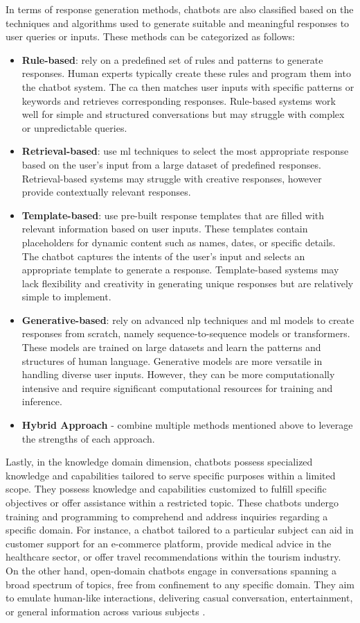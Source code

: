 \documentclass[a4paper,fleqn]{cas-dc}
\begin{document}
In terms of response generation methods, chatbots are also classified based on the techniques and algorithms used to generate suitable and meaningful responses to user queries or inputs. These methods can be categorized as follows:

\begin{itemize}
	\item \textbf{Rule-based}: rely on a predefined set of rules and patterns to generate responses. Human experts typically create these rules and program them into the chatbot system. The \gls{ca} then matches user inputs with specific patterns or keywords and retrieves corresponding responses. Rule-based systems work well for simple and structured conversations but may struggle with complex or unpredictable queries.
	\item \textbf{Retrieval-based}: use \gls{ml} techniques to select the most appropriate response based on the user's input from a large dataset of predefined responses. Retrieval-based systems may struggle with creative responses, however provide contextually relevant responses.
	\item \textbf{Template-based}:  use pre-built response templates that are filled with relevant information based on user inputs. These templates contain placeholders for dynamic content such as names, dates, or specific details. The chatbot captures the intents of the user's input and selects an appropriate template to generate a response. Template-based systems may lack flexibility and creativity in generating unique responses but are relatively simple to implement.
	\item \textbf{Generative-based}: rely on advanced \gls{nlp} techniques and \gls{ml} models to create responses from scratch, namely sequence-to-sequence models or transformers. These models are trained on large datasets and learn the patterns and structures of human language. Generative models are more versatile in handling diverse user inputs. However, they can be more computationally intensive and require significant computational resources for training and inference.
	\item \textbf{Hybrid Approach} - combine multiple methods mentioned above to leverage the strengths of each approach.
\end{itemize}

Lastly, in the knowledge domain dimension, chatbots possess specialized knowledge and capabilities tailored to serve specific purposes within a limited scope. They possess knowledge and capabilities customized to fulfill specific objectives or offer assistance within a restricted topic. These chatbots undergo training and programming to comprehend and address inquiries regarding a specific domain. For instance, a chatbot tailored to a particular subject can aid in customer support for an e-commerce platform, provide medical advice in the healthcare sector, or offer travel recommendations within the tourism industry. On the other hand, open-domain chatbots engage in conversations spanning a broad spectrum of topics, free from confinement to any specific domain. They aim to emulate human-like interactions, delivering casual conversation, entertainment, or general information across various subjects \cite{mohamad_2021}.
\end{document}
